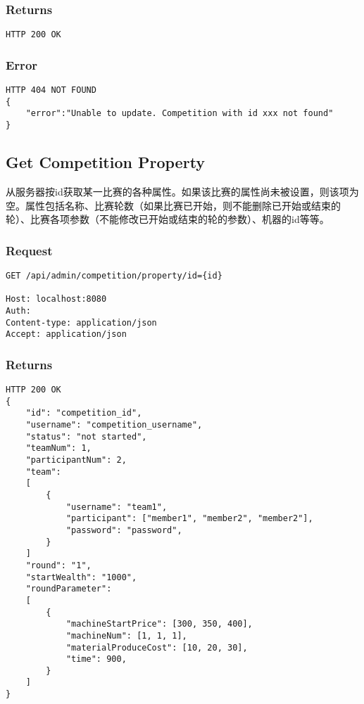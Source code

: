 \documentclass{article}
\begin{document}
\subsubsection*{Returns}
\begin{lstlisting}
HTTP 200 OK
\end{lstlisting}

\subsubsection*{Error}
\begin{lstlisting}
HTTP 404 NOT FOUND
{
    "error":"Unable to update. Competition with id xxx not found"
}
\end{lstlisting}


\subsection{Get Competition Property}

从服务器按id获取某一比赛的各种属性。如果该比赛的属性尚未被设置，则该项为空。属性包括名称、比赛轮数（如果比赛已开始，则不能删除已开始或结束的轮）、比赛各项参数（不能修改已开始或结束的轮的参数）、机器的id等等。

\subsubsection*{Request}
\begin{lstlisting}
GET /api/admin/competition/property/id={id}

Host: localhost:8080
Auth:
Content-type: application/json
Accept: application/json
\end{lstlisting}

\subsubsection*{Returns}
\begin{lstlisting}
HTTP 200 OK
{
    "id": "competition_id",
    "username": "competition_username",
    "status": "not started",
    "teamNum": 1,
    "participantNum": 2,
    "team":
    [
        {
            "username": "team1",
            "participant": ["member1", "member2", "member2"],
            "password": "password",
        }
    ]
    "round": "1",
    "startWealth": "1000",
    "roundParameter":
    [
        {
            "machineStartPrice": [300, 350, 400],
            "machineNum": [1, 1, 1],
            "materialProduceCost": [10, 20, 30],
            "time": 900,
        }
    ]
}

\end{lstlisting}
\end{document}
